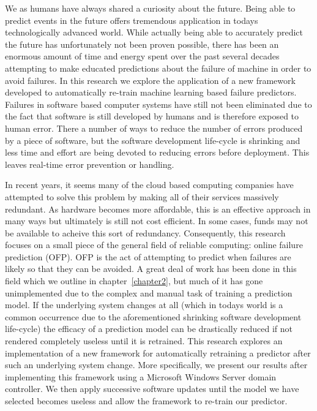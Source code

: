 We as humans have always shared a curiosity about the future.  Being able to
predict events in the future offers tremendous application in todays
technologically advanced world.  While actually being able to accurately
predict the future has unfortunately not been proven possible, there has been
an enormous amount of time and energy spent over the past several decades
attempting to make educated predictions about the failure of machine in order
to avoid failures.  In this research we explore the application of a new
framework developed to automatically re-train machine learning based failure
predictors.  Failures in software based computer systems have still not been
eliminated due to the fact that software is still developed by humans and is
therefore exposed to human error.  There a number of ways to reduce the number
of errors produced by a piece of software, but the software development
life-cycle is shrinking and less time and effort are being devoted to reducing
errors before deployment.  This leaves real-time error prevention or handling.  

In recent years, it seems many of the cloud based computing companies have
attempted to solve this problem by making all of their services massively
redundant.  As hardware becomes more affordable, this is an effective approach
in many ways but ultimately is still not cost efficient.  In some cases, funds
may not be available to acheive this sort of redundancy.  Consequently, this
research focuses on a small piece of the general field of reliable computing:
online failure prediction (OFP).  OFP is the act of attempting
to predict when failures are likely so that they can be avoided.  A great deal
of work has been done in this field which we outline in chapter~\ref{chapter2},
but much of it has gone unimplemented due to the complex and manual task of
training a prediction model.  If the underlying system changes at all (which in
todays world is a common occurrence due to the aforementioned shrinking
software development life-cycle) the efficacy of a prediction model can be
drastically reduced if not rendered completely useless until it is retrained.
This research explores an implementation of a new framework for automatically
retraining a predictor after such an underlying system change.  More
specifically, we present our results after implementing this framework using a
Microsoft Windows Server domain controller.  We then apply successive software
updates until the model we have selected becomes useless and allow the
framework to re-train our predictor.

